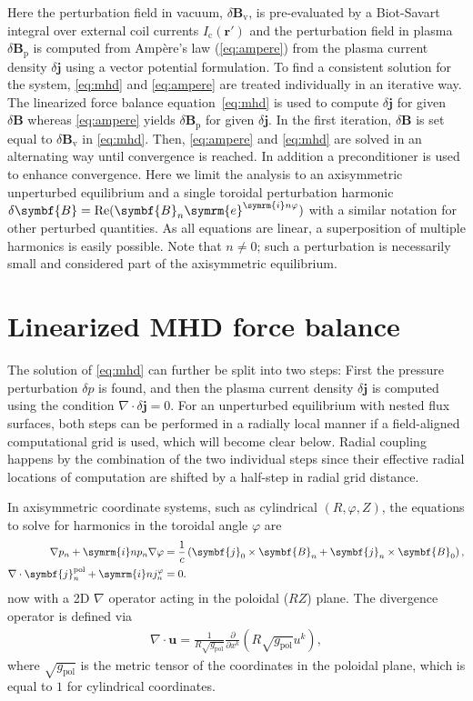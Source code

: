 \documentclass[a4paper, 10pt, english]{article}
\let\temp\vartheta
\let\vartheta\theta
\let\theta\temp
\let\temp\varphi
\let\varphi\phi
\let\phi\temp
\let\vec\symbf
\newcommand*\e{\ensuremath{\symrm{e}}}
\newcommand*\im{\ensuremath{\symrm{i}}}
\newcommand*\pd[2][]{\ensuremath{\frac{\partial #1}{\partial #2}}}
\newcommand*\pol{\ensuremath{\textrm{pol}}}
\DeclareMathOperator\Real{Re}
\begin{document}
Here the perturbation field in vacuum, $\delta \vec{B}_{\text{v}}$, is pre-evaluated by a Biot-Savart integral over external coil currents $I_{\text{c}}(\vec{r}')$ and the perturbation field in plasma $\delta \vec{B}_{\text{p}}$ is computed from Ampère's law (\ref{eq:ampere}) from the plasma current density $\delta \vec{j}$ using a vector potential formulation. To find a consistent solution for the system, \cref{eq:mhd} and \cref{eq:ampere} are treated individually in an iterative way. The linearized force balance equation~\eqref{eq:mhd} is used to compute $\delta \vec{j}$ for given $\delta \vec{B}$ whereas \cref{eq:ampere} yields $\delta \vec{B}_{\text{p}}$ for given $\delta \vec{j}$. In the first iteration, $\delta \vec{B}$ is set equal to $\delta \vec{B}_{\text{v}}$ in \cref{eq:mhd}. Then, \cref{eq:ampere} and \cref{eq:mhd} are solved in an alternating way until convergence is reached. In addition a preconditioner is used to enhance convergence. Here we limit the analysis to an axisymmetric unperturbed equilibrium and a single toroidal perturbation harmonic $\delta \vec{B} = \Real (\vec{B}_{n} \e^{\im n \phi})$ with a similar notation for other perturbed quantities. As all equations are linear, a superposition of multiple harmonics is easily possible. Note that $n \neq 0$; such a perturbation is necessarily small and considered part of the axisymmetric equilibrium.

\section{Linearized MHD force balance}

The solution of \cref{eq:mhd} can further be split into two steps: First the pressure perturbation $\delta p$ is found, and then the plasma current density $\delta \vec{j}$ is computed using the condition $\nabla \cdot \delta \vec{j} = 0$. For an unperturbed equilibrium with nested flux surfaces, both steps can be performed in a radially local manner if a field-aligned computational grid is used, which will become clear below. Radial coupling happens by the combination of the two individual steps since their effective radial locations of computation are shifted by a half-step in radial grid distance.

In axisymmetric coordinate systems, such as cylindrical $(R, \phi, Z)$, the equations to solve for harmonics in the toroidal angle $\phi$ are
\begin{align}
  \nabla p_{n} + \im n p_{n} \nabla \phi &= \frac{1}{c} \left( \vec{j}_{0} \times \vec{B}_{n} + \vec{j}_{n} \times \vec{B}_{0} \right), \label{eq:mhd-2} \\
  \nabla \cdot \vec{j}_{n}^{\pol}+ \im n j_{n}^{\phi} &= 0. \label{eq:divfree-2}
\end{align}
now with a 2D $\nabla$ operator acting in the poloidal ($RZ$) plane. The divergence operator is defined via
\begin{gather*}
  \nabla \cdot \vec{u} = \frac{1}{R \sqrt{g_{\pol}}} \pd{x^{k}} (R \sqrt{g_{\pol}} u^{k}),
\end{gather*}
where $\sqrt{g_{\pol}}$ is the metric tensor of the coordinates in the poloidal plane, which is equal to $1$ for cylindrical coordinates.
\end{document}
